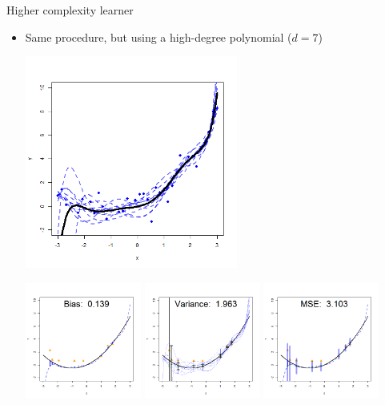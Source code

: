 \documentclass[11pt,compress,t,notes=noshow, xcolor=table]{beamer}
\begin{document}
\begin{vbframe} {Higher complexity learner}

\begin{itemize}
\item Same procedure, but using a high-degree polynomial ($d=7$)

\begin{center}
  \includegraphics[width = 0.55\textwidth]{figure/bias_variance_decomposition-complex_model.png}
\end{center}


\framebreak

\begin{center}
  \includegraphics[width = 0.3\textwidth]{figure/bias_variance_decomposition-complex_model_bias.png}
  \includegraphics[width = 0.3\textwidth]{figure/bias_variance_decomposition-complex_model_variance.png}
  \includegraphics[width = 0.3\textwidth]{figure/bias_variance_decomposition-complex_model_mse.png}
\end{center}



\end{itemize}
\end{vbframe}
\end{document}
